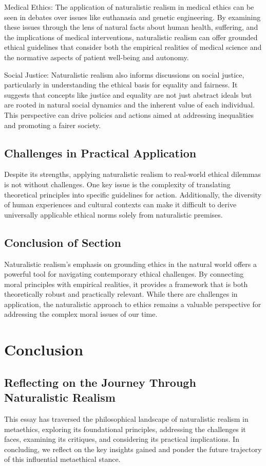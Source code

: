 \documentclass[12pt,a4paper]{article}
\begin{document}
Medical Ethics: The application of naturalistic realism in medical ethics can be seen in debates over issues like euthanasia and genetic engineering. By examining these issues through the lens of natural facts about human health, suffering, and the implications of medical interventions, naturalistic realism can offer grounded ethical guidelines that consider both the empirical realities of medical science and the normative aspects of patient well-being and autonomy.

Social Justice: Naturalistic realism also informs discussions on social justice, particularly in understanding the ethical basis for equality and fairness. It suggests that concepts like justice and equality are not just abstract ideals but are rooted in natural social dynamics and the inherent value of each individual. This perspective can drive policies and actions aimed at addressing inequalities and promoting a fairer society.

\subsection{Challenges in Practical Application}
Despite its strengths, applying naturalistic realism to real-world ethical dilemmas is not without challenges. One key issue is the complexity of translating theoretical principles into specific guidelines for action. Additionally, the diversity of human experiences and cultural contexts can make it difficult to derive universally applicable ethical norms solely from naturalistic premises.

\subsection{Conclusion of Section}
Naturalistic realism's emphasis on grounding ethics in the natural world offers a powerful tool for navigating contemporary ethical challenges. By connecting moral principles with empirical realities, it provides a framework that is both theoretically robust and practically relevant. While there are challenges in application, the naturalistic approach to ethics remains a valuable perspective for addressing the complex moral issues of our time.

\section*{Conclusion}

\subsection*{Reflecting on the Journey Through Naturalistic Realism}
This essay has traversed the philosophical landscape of naturalistic realism in metaethics, exploring its foundational principles, addressing the challenges it faces, examining its critiques, and considering its practical implications. In concluding, we reflect on the key insights gained and ponder the future trajectory of this influential metaethical stance.
\end{document}
